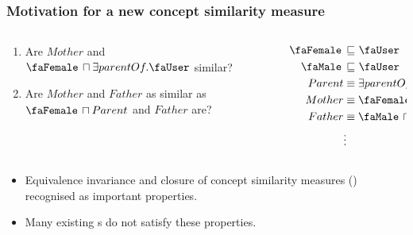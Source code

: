 \documentclass[smaller, dvipsnames]{beamer}
\begin{document}
\begin{frame}
  \frametitle{Motivation for a new concept similarity measure}
  \begin{columns}
    \begin{column}{0.55\textwidth}
      \begin{enumerate}
        \item Are \(Mother\) and \(\text{\faFemale}\, \sqcap \exists{}parentOf.\text{\faUser}\) similar?
        \item Are \(Mother\) and \(Father\) as similar
        as \(\text{\faFemale}\, \sqcap Parent\) and \(Father\) are?
      \end{enumerate}
    \end{column}
    \begin{column}{0.45\textwidth}
        \begin{align*}
          \text{\faFemale}\, &\subsume{} \text{\faUser} \\
          \text{\faMale}\, &\subsume{} \text{\faUser} \\
          Parent &\equiv \exists{}parentOf.\text{\faUser} \\
          Mother &\equiv \text{\faFemale}\, \sqcap Parent \\
          Father &\equiv \text{\faMale}\, \sqcap Parent \\
          &\vdots
        \end{align*}
    \end{column}
  \end{columns}
  \onslide<+->
  \begin{itemize}[<+->]
    \item Equivalence \alert{invariance} and \alert{closure}
    of concept similarity measures (\csm)
    recognised as important properties.
    \item Many existing \csm{}s do \alert{not} satisfy these properties.
  \end{itemize}
\end{frame}
\end{document}
